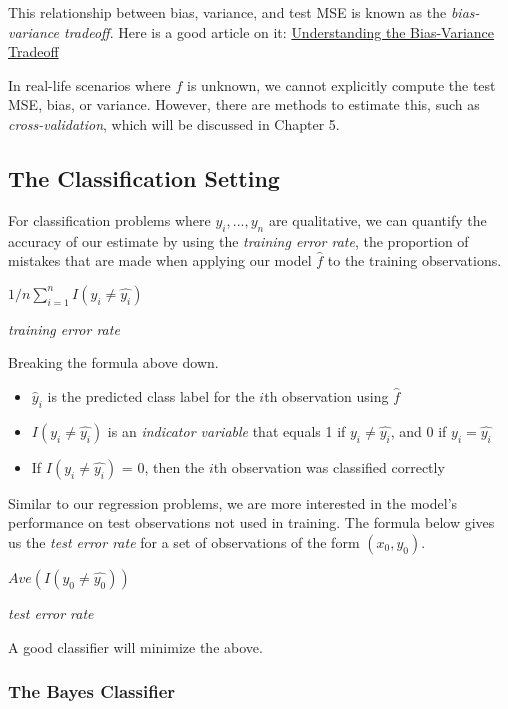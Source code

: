 \documentclass[]{book}
\providecommand{\tightlist}{%
  \setlength{\itemsep}{0pt}\setlength{\parskip}{0pt}}
\begin{document}
This relationship between bias, variance, and test MSE is known as the \emph{bias-variance tradeoff}. Here is a good article on it: \href{http://scott.fortmann-roe.com/docs/BiasVariance.html}{Understanding the Bias-Variance Tradeoff}

In real-life scenarios where \(f\) is unknown, we cannot explicitly compute the test MSE, bias, or variance. However, there are methods to estimate this, such as \emph{cross-validation}, which will be discussed in Chapter 5.

\hypertarget{the-classification-setting}{%
\subsection{The Classification Setting}\label{the-classification-setting}}

For classification problems where \(y_i,...,y_n\) are qualitative, we can quantify the accuracy of our estimate by using the \emph{training error rate}, the proportion of mistakes that are made when applying our model \(\hat{f}\) to the training observations.

\(1/n\sum_{i=1}^nI(y_i \neq \hat{y_i})\)

\emph{training error rate}

Breaking the formula above down.

\begin{itemize}
\tightlist
\item
  \(\hat{y}_i\) is the predicted class label for the \(i\)th observation using \(\hat{f}\)
\item
  \(I(y_i \neq \hat{y_i})\) is an \emph{indicator variable} that equals 1 if \(y_i \neq \hat{y_i}\), and 0 if \(y_i = \hat{y_i}\)
\item
  If \(I(y_i \neq \hat{y_i})\) = 0, then the \(i\)th observation was classified correctly
\end{itemize}

Similar to our regression problems, we are more interested in the model's performance on test observations not used in training. The formula below gives us the \emph{test error rate} for a set of observations of the form \((x_0, y_0)\).

\(Ave(I(y_0 \neq \hat{y_0}))\)

\emph{test error rate}

A good classifier will minimize the above.

\hypertarget{the-bayes-classifier}{%
\subsubsection{The Bayes Classifier}\label{the-bayes-classifier}}
\end{document}
